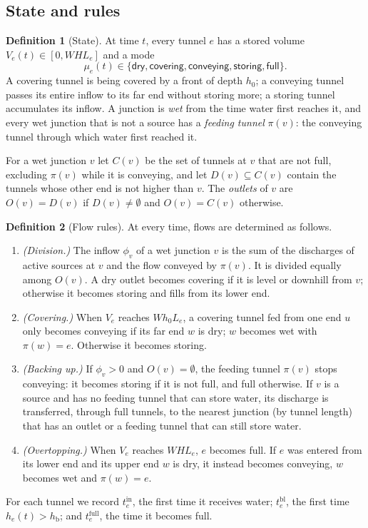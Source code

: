 \documentclass[11pt,a4paper]{article}
\theoremstyle{plain}
\theoremstyle{definition}
\newtheorem{definition}{Definition}
\theoremstyle{remark}
\newcommand{\tin}{t^{\mathrm{in}}}
\newcommand{\tbl}{t^{\mathrm{bl}}}
\newcommand{\tfull}{t^{\mathrm{full}}}
\newcommand{\hb}{h_{\mathrm{b}}}
\begin{document}
\subsection{State and rules}

\begin{definition}[State]
At time $t$, every tunnel $e$ has a stored volume $V_e(t) \in [0, WHL_e]$ and a mode
\[
  \mu_e(t) \in \{\textsf{dry}, \textsf{covering}, \textsf{conveying}, \textsf{storing}, \textsf{full}\}.
\]
A \textsf{covering} tunnel is being covered by a front of depth $h_0$; a \textsf{conveying} tunnel passes its entire inflow to its far end without storing more; a \textsf{storing} tunnel accumulates its inflow. A junction is \emph{wet} from the time water first reaches it, and every wet junction that is not a source has a \emph{feeding tunnel} $\pi(v)$: the conveying tunnel through which water first reached it.
\end{definition}

For a wet junction $v$ let $C(v)$ be the set of tunnels at $v$ that are not full, excluding $\pi(v)$ while it is conveying, and let $D(v) \subseteq C(v)$ contain the tunnels whose other end is not higher than $v$. The \emph{outlets} of $v$ are $O(v) = D(v)$ if $D(v) \neq \emptyset$ and $O(v) = C(v)$ otherwise.

\begin{definition}[Flow rules]\label{def:rules}
At every time, flows are determined as follows.
\begin{enumerate}[leftmargin=2.2em, itemsep=2pt, topsep=2pt, label=\textbf{R\arabic*}]
  \item \emph{(Division.)} The inflow $\phi_v$ of a wet junction $v$ is the sum of the discharges of active sources at $v$ and the flow conveyed by $\pi(v)$. It is divided equally among $O(v)$. A dry outlet becomes \textsf{covering} if it is level or downhill from $v$; otherwise it becomes \textsf{storing} and fills from its lower end.
  \item \emph{(Covering.)} When $V_e$ reaches $W h_0 L_e$, a covering tunnel fed from one end $u$ only becomes \textsf{conveying} if its far end $w$ is dry; $w$ becomes wet with $\pi(w) = e$. Otherwise it becomes \textsf{storing}.
  \item \emph{(Backing up.)} If $\phi_v > 0$ and $O(v) = \emptyset$, the feeding tunnel $\pi(v)$ stops conveying: it becomes \textsf{storing} if it is not full, and \textsf{full} otherwise. If $v$ is a source and has no feeding tunnel that can store water, its discharge is transferred, through full tunnels, to the nearest junction (by tunnel length) that has an outlet or a feeding tunnel that can still store water.
  \item \emph{(Overtopping.)} When $V_e$ reaches $WHL_e$, $e$ becomes \textsf{full}. If $e$ was entered from its lower end and its upper end $w$ is dry, it instead becomes \textsf{conveying}, $w$ becomes wet and $\pi(w) = e$.
\end{enumerate}
For each tunnel we record $\tin_e$, the first time it receives water; $\tbl_e$, the first time $h_e(t) > \hb$; and $\tfull_e$, the time it becomes full.
\end{definition}
\end{document}
